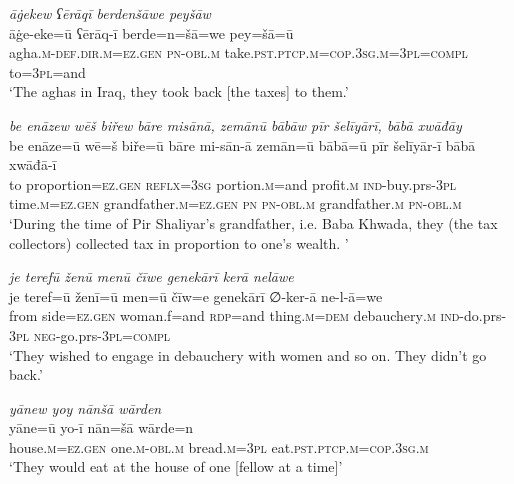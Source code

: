\ea \label{BP.28}
\textit{āġekew ʕērāqī berdenšāwe peyšāw} \\ 
\gll āġe-eke=ū ʕērāq-ī berde=n=šā=we pey=šā=ū \\ 
 agha\textsc{.m}\textsc{-def}\textsc{.dir}\textsc{.m}\textsc{=ez.gen} \textsc{pn}\textsc{-obl}\textsc{.m} take\textsc{.pst}\textsc{.ptcp}\textsc{.m}\textsc{=cop}\textsc{.3sg}\textsc{.m}\textsc{=3pl}\textsc{=compl} to\textsc{=3pl}=and \\ 
\glt `The aghas in Iraq, they took back [the taxes] to them.'
\z 
 
\ea \label{BP.31}
\textit{be enāzew wēš biřew bāre misānā, zemānū bābāw pīr šelīyārī, bābā xwāđāy} \\ 
\gll be enāze=ū wē=š biře=ū bāre mi-sān-ā zemān=ū bābā=ū pīr šelīyār-ī bābā xwāđā-ī \\ 
 to proportion\textsc{=ez.gen} \textsc{reflx}\textsc{=3sg} portion\textsc{.m}=and profit\textsc{.m} \textsc{ind-}buy.prs\textsc{-3pl} time\textsc{.m}\textsc{=ez.gen} grandfather\textsc{.m}\textsc{=ez.gen} \textsc{pn} \textsc{pn}\textsc{-obl}\textsc{.m} grandfather\textsc{.m} \textsc{pn}\textsc{-obl}\textsc{.m} \\ 
\glt `During the time of Pir Shaliyar’s grandfather, i.e. Baba Khwada, they (the tax collectors) collected tax in proportion to one’s wealth. '
\z 
 
\ea \label{BP.36}
\textit{je terefū ženū menū čīwe genekārī kerā nelāwe} \\ 
\gll je teref=ū ženī=ū men=ū čīw=e genekārī ∅-ker-ā ne-l-ā=we \\ 
 from side\textsc{=ez.gen} woman.f=and \textsc{rdp}=and thing\textsc{.m}\textsc{=dem} debauchery\textsc{.m} \textsc{ind-}do.prs\textsc{-3pl} \textsc{neg-}go.prs\textsc{-3pl}\textsc{=compl} \\ 
\glt `They wished to engage in debauchery with women and so on. They didn’t go back.'
\z 
 
\ea \label{BP.39}
\textit{yānew yoy nānšā wārden} \\ 
\gll yāne=ū yo-ī nān=šā wārde=n \\ 
 house\textsc{.m}\textsc{=ez.gen} one\textsc{.m}\textsc{-obl}\textsc{.m} bread\textsc{.m}\textsc{=3pl} eat\textsc{.pst}\textsc{.ptcp}\textsc{.m}\textsc{=cop}\textsc{.3sg}\textsc{.m} \\ 
\glt `They would eat at the house of one [fellow at a time]'
\z 
 
